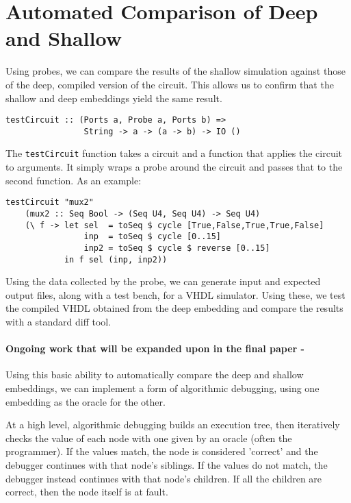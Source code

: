 \documentclass{llncs}
\begin{document}
\section{Automated Comparison of Deep and Shallow}
\label{sec:comparing}

Using probes, we can compare the results of the shallow simulation
against those of the deep, compiled version of the circuit. This allows us to
confirm that the shallow and deep embeddings yield the same result.

\begin{verbatim}
testCircuit :: (Ports a, Probe a, Ports b) =>
                String -> a -> (a -> b) -> IO ()
\end{verbatim}

The \verb!testCircuit! function takes a circuit and
a function that applies the circuit to arguments. It simply wraps a probe around
the circuit and passes that to the second function. As an example:

\begin{verbatim}
testCircuit "mux2" 
    (mux2 :: Seq Bool -> (Seq U4, Seq U4) -> Seq U4)
    (\ f -> let sel  = toSeq $ cycle [True,False,True,True,False]
                inp  = toSeq $ cycle [0..15]
                inp2 = toSeq $ cycle $ reverse [0..15]
            in f sel (inp, inp2))  
\end{verbatim}

Using the data collected by the probe, we can generate input and expected output
files, along with a test bench, for a VHDL simulator. Using these, we test the
compiled VHDL obtained from the deep embedding and compare the results with 
a standard diff tool.

\paragraph{Ongoing work that will be expanded upon in the final paper - }
Using this basic ability to automatically compare the deep and shallow embeddings,
we can implement a form of algorithmic debugging, using one embedding as the
oracle for the other.

At a high level, algorithmic debugging builds an execution tree, then iteratively
checks the value of each node with one given by an oracle (often the programmer).
If the values match, the node is considered 'correct' and the debugger continues
with that node's siblings. If the values do not match, the debugger instead continues
with that node's children. If all the children are correct, then the node itself is
at fault.
\end{document}
